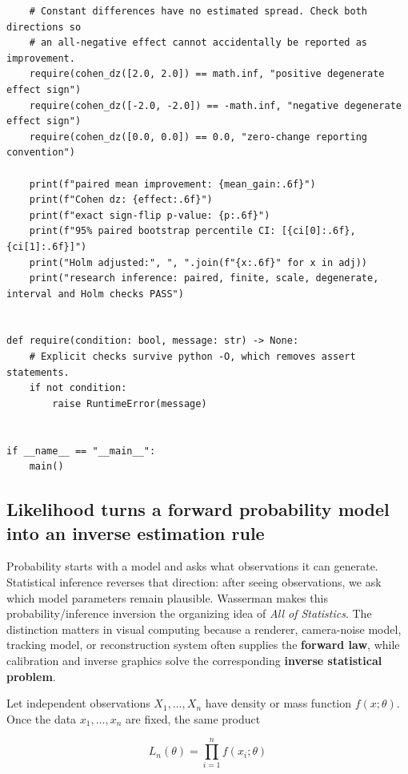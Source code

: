 \begin{verbatim}
    # Constant differences have no estimated spread. Check both directions so
    # an all-negative effect cannot accidentally be reported as improvement.
    require(cohen_dz([2.0, 2.0]) == math.inf, "positive degenerate effect sign")
    require(cohen_dz([-2.0, -2.0]) == -math.inf, "negative degenerate effect sign")
    require(cohen_dz([0.0, 0.0]) == 0.0, "zero-change reporting convention")

    print(f"paired mean improvement: {mean_gain:.6f}")
    print(f"Cohen dz: {effect:.6f}")
    print(f"exact sign-flip p-value: {p:.6f}")
    print(f"95% paired bootstrap percentile CI: [{ci[0]:.6f}, {ci[1]:.6f}]")
    print("Holm adjusted:", ", ".join(f"{x:.6f}" for x in adj))
    print("research inference: paired, finite, scale, degenerate, interval and Holm checks PASS")


def require(condition: bool, message: str) -> None:
    # Explicit checks survive python -O, which removes assert statements.
    if not condition:
        raise RuntimeError(message)


if __name__ == "__main__":
    main()
\end{verbatim}

\subsection{Likelihood turns a forward probability model into an inverse estimation rule}\label{02-foundations-ii-ch030-likelihood-turns-a-forward-probability-model-into-an-inverse-estimation-rule}

\hypertarget{02-foundations-ii-ch030-likelihood-turns-a-forward-probability-model-into-an-inverse-estimation-rule}{}

Probability starts with a model and asks what observations it can generate. Statistical inference reverses that direction: after seeing observations, we ask which model parameters remain plausible. Wasserman makes this probability/inference inversion the organizing idea of \emph{All of Statistics}. The distinction matters in visual computing because a renderer, camera-noise model, tracking model, or reconstruction system often supplies the \textbf{forward law}, while calibration and inverse graphics solve the corresponding \textbf{inverse statistical problem}.

Let independent observations \(X_1,\ldots,X_n\) have density or mass function \(f(x;\theta)\). Once the data \(x_1,\ldots,x_n\) are fixed, the same product

\[
L_n(\theta)=\prod_{i=1}^{n} f(x_i;\theta)
\]

